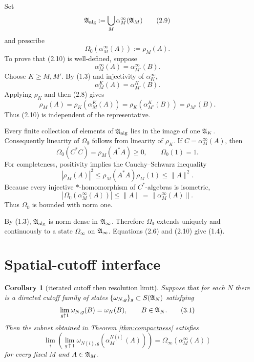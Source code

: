 \documentclass[11pt,a4paper]{article}
\newtheorem{corollary}[theorem]{Corollary}
\begin{document}

Set
\[
 \mathfrak A_{\rm alg}:=\bigcup_M\alpha_M^\infty(\mathfrak A_M)                  \tag{2.9}
\]
and prescribe
\[
 \Omega_0(\alpha_M^\infty(A)):=\rho_M(A).                      \tag{2.10}
\]
To prove that (2.10) is well-defined, suppose
\[
 \alpha_M^\infty(A)=\alpha_{M'}^\infty(B).                     \tag{2.11}
\]
Choose \(K\ge M,M'\).  By (1.3) and injectivity of
\(\alpha_K^\infty\),
\[
 \alpha_M^K(A)=\alpha_{M'}^K(B).                               \tag{2.12}
\]
Applying \(\rho_K\) and then (2.8) gives
\[
 \rho_M(A)=\rho_K(\alpha_M^K(A))
 =\rho_K(\alpha_{M'}^K(B))=\rho_{M'}(B).                       \tag{2.13}
\]
Thus (2.10) is independent of the representative.


Every finite collection of elements of \(\mathfrak A_{\rm alg}\) lies in the image of one
\(\mathfrak A_K\).  Consequently linearity of \(\Omega_0\) follows from linearity of
\(\rho_K\).  If \(C=\alpha_M^\infty(A)\), then
\[
 \Omega_0(C^*C)=\rho_M(A^*A)\ge0,\qquad \Omega_0(1)=1.          \tag{2.14}
\]
For completeness, positivity implies the Cauchy--Schwarz inequality
\[
 |\rho_M(A)|^2\le\rho_M(A^*A)\rho_M(1)
 \le\|A\|^2.                                                    \tag{2.15}
\]
Because every injective \( * \)-homomorphism of \(C^*\)-algebras is isometric,
\[
 |\Omega_0(\alpha_M^\infty(A))|
 \le\|A\|=\|\alpha_M^\infty(A)\|.                              \tag{2.16}
\]
Thus \(\Omega_0\) is bounded with norm one.


By (1.3), \(\mathfrak A_{\rm alg}\) is norm dense in \(\mathfrak A_\infty\).  Therefore
\(\Omega_0\) extends uniquely and continuously to a state
\(\Omega_\infty\) on \(\mathfrak A_\infty\).  Equations (2.6) and (2.10) give
(1.4).  \QedStep

\section{Spatial-cutoff interface}

\begin{corollary}[iterated cutoff then resolution limit]\label{cor:cutoff}
Suppose that for each \(N\) there is a directed cutoff family of states
\(\{\omega_{N,g}\}_g\subset S(\mathfrak A_N)\) satisfying
\[
 \lim_{g\uparrow1}\omega_{N,g}(B)=\omega_N(B),\qquad B\in\mathfrak A_N. \tag{3.1}
\]
Then the subnet obtained in Theorem \ref{thm:compactness} satisfies
\[
 \lim_i\left(\lim_{g\uparrow1}
 \omega_{N(i),g}(\alpha_M^{N(i)}(A))\right)
 =\Omega_\infty(\alpha_M^\infty(A))                            \tag{3.2}
\]
for every fixed \(M\) and \(A\in\mathfrak A_M\).
\end{corollary}
\end{document}
